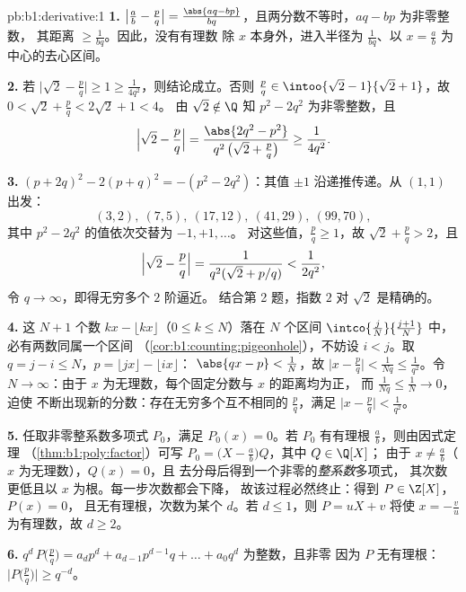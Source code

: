 \begin{solution}{pb:b1:derivative:1}
\textbf{1.} $\bigl|\frac ab - \frac pq\bigr| = \frac{\abs{aq -
bp}}{bq}$，且两分数不等时，$aq - bp$ 为非零整数，
其距离 $\geq \frac{1}{bq}$。因此，没有有理数
除 $x$ 本身外，进入半径为
$\frac{1}{bq}$、以 $x = \frac ab$ 为中心的去心区间。

\textbf{2.} 若 $\bigl|\sqrt2 - \frac pq\bigr| \geq 1 \geq
\frac{1}{4q^2}$，则结论成立。否则 $\frac pq \in \intoo{\sqrt2 -
1}{\sqrt2 + 1}$，故 $0 < \sqrt2 + \frac pq < 2\sqrt2 + 1 < 4$。
由 $\sqrt 2 \notin \Q$ 知 $p^2 - 2q^2$ 为非零整数，且
\[
\Bigl|\sqrt2 - \frac pq\Bigr|
= \frac{\abs{2q^2 - p^2}}{q^2\,\bigl(\sqrt2 + \frac pq\bigr)}
\geq \frac{1}{4q^2} .
\]

\textbf{3.} $(p + 2q)^2 - 2(p + q)^2 = -(p^2 - 2q^2)$：其值
$\pm1$ 沿递推传递。从 $(1,1)$ 出发：
\[
(3,2),\ (7,5),\ (17,12),\ (41,29),\ (99,70),
\]
其中 $p^2 - 2q^2$ 的值依次交替为 $-1, +1, \dots$。
对这些值，$\frac pq \geq 1$，故 $\sqrt2 + \frac pq > 2$，且
\[
\Bigl|\sqrt2 - \frac pq\Bigr| =
\frac{1}{q^2(\sqrt2 + p/q)} < \frac{1}{2q^2} ,
\]
令 $q \to \infty$，即得无穷多个 $2$ 阶逼近。
结合第 2 题，指数 $2$ 对 $\sqrt 2$ 是精确的。

\textbf{4.} 这 $N + 1$ 个数 $kx - \lfloor kx\rfloor$（$0
\leq k \leq N$）落在 $N$ 个区间 $\intco{\frac
jN}{\frac{j+1}{N}}$ 中，必有两数同属一个区间
（\cref{cor:b1:counting:pigeonhole}），不妨设 $i < j$。取 $q =
j - i \leq N$，$p = \lfloor jx\rfloor - \lfloor ix\rfloor$：
$\abs{qx - p} < \frac1N$，故 $\bigl|x - \frac pq\bigr| <
\frac{1}{Nq} \leq \frac{1}{q^2}$。令 $N \to \infty$：由于
$x$ 为无理数，每个固定分数与 $x$ 的距离均为正，
而 $\frac{1}{Nq} \leq \frac 1N \to 0$，迫使
不断出现新的分数：存在无穷多个互不相同的 $\frac pq$，满足
$\bigl|x - \frac pq\bigr| < \frac{1}{q^2}$。

\textbf{5.} 任取非零整系数多项式 $P_0$，满足 $P_0(x) =
0$。若 $P_0$ 有有理根 $\frac ab$，则由因式定理
（\cref{thm:b1:poly:factor}）可写 $P_0 = \bigl(X - \frac
ab\bigr)Q$，其中 $Q \in \Q[X]$；
由于 $x \neq \frac ab$（$x$ 为无理数），$Q(x) = 0$，且
去分母后得到一个非零的\emph{整系数}多项式，
其次数更低且以 $x$ 为根。每一步次数都会下降，
故该过程必然终止：得到 $P \in \Z[X]$，$P(x) = 0$，
且无有理根，次数为某个 $d$。若 $d \leq 1$，则 $P =
uX + v$ 将使 $x = -\frac vu$ 为有理数，故 $d \geq 2$。

\textbf{6.} $q^d\,P\bigl(\frac pq\bigr) = a_d p^d + a_{d-1}
p^{d-1} q + \dots + a_0 q^d$ 为整数，且非零
因为 $P$ 无有理根：$\bigl|P\bigl(\frac
pq\bigr)\bigr| \geq q^{-d}$。


\end{solution}
